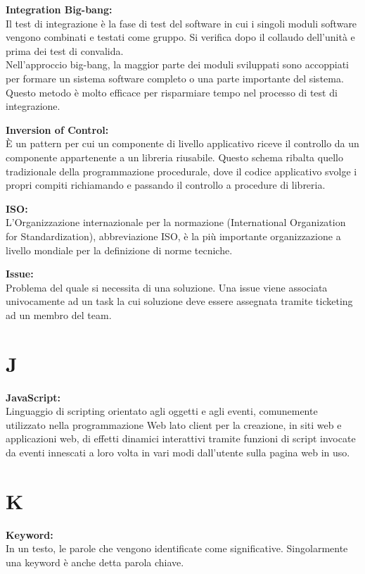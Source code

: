 \documentclass[a4paper, oneside, openany, dvipsnames, table]{article}
\begin{document}
\textbf{Integration Big-bang:}\\Il test di integrazione è la fase di test del software in cui i singoli 
moduli software vengono combinati e testati come gruppo. Si verifica dopo il collaudo dell'unità e prima 
dei test di convalida.
\\Nell'approccio big-bang, la maggior parte dei moduli sviluppati sono accoppiati per formare un 
sistema software completo o una parte importante del sistema.
 Questo metodo è molto efficace per risparmiare tempo nel processo di test di integrazione. 

\textbf{Inversion of Control:}\\	\`E un pattern per cui un componente di livello applicativo riceve il controllo da un componente appartenente a un libreria riusabile. Questo schema ribalta quello tradizionale della programmazione procedurale, dove il codice applicativo svolge i propri compiti richiamando e passando il controllo a procedure di libreria.

\textbf{ISO:}\\L'Organizzazione internazionale per la normazione 
(International Organization for Standardization), abbreviazione ISO, è la più importante organizzazione a livello mondiale per la definizione di norme tecniche.

\textbf{Issue:}\\ Problema del quale si necessita di una soluzione. Una issue viene associata univocamente ad un task la cui soluzione deve essere assegnata tramite ticketing ad un membro del team.

\newpage
\section{J}
\textbf{JavaScript:}\\	Linguaggio di scripting orientato agli oggetti e agli eventi, comunemente utilizzato nella programmazione Web lato client per la creazione, in siti web e applicazioni web, di effetti dinamici interattivi tramite funzioni di script invocate da eventi innescati a loro volta in vari modi dall'utente sulla pagina web in uso.

\newpage
\section{K}
\textbf{Keyword:}\\	In un testo, le parole che vengono identificate come significative. Singolarmente una keyword è anche detta parola chiave.
\end{document}
